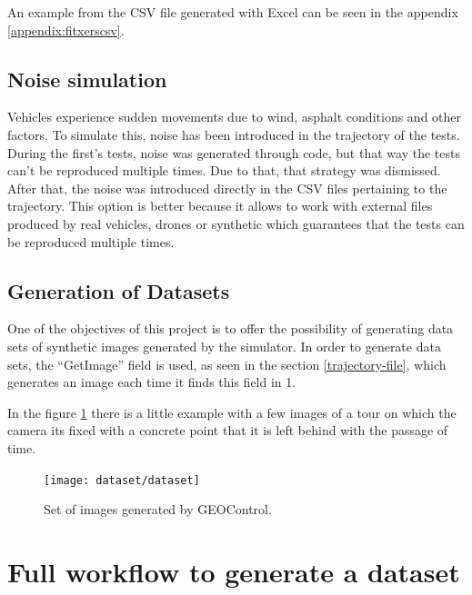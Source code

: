 \documentclass[10pt,a4paper,twocolumn,twoside]{article}
\begin{document}
An example from the CSV file generated with Excel can be seen in the appendix \ref{appendix:fitxerscsv}.

\subsection{Noise simulation}

Vehicles experience sudden movements due to wind, asphalt conditions and other factors. To simulate this, noise has been introduced in the trajectory of the tests. During the first’s tests, noise was generated through code, but that way the tests can't be reproduced multiple times. Due to that, that strategy was dismissed. After that, the noise was introduced directly in the CSV files pertaining to the trajectory. This option is better because it allows to work with external files produced by real vehicles, drones or synthetic which guarantees that the tests can be reproduced multiple times.

\subsection{Generation of Datasets}
One of the objectives of this project is to offer the possibility of generating data sets of synthetic images generated by the simulator. In order to generate data sets, the ``GetImage'' field is used, as seen in the section \ref{trajectory-file}, which generates an image each time it finds this field in 1.

In the figure \ref{fig-dataset} there is a little example with a few images of a tour on which the camera its fixed with a concrete point that it is left behind with the passage of time.

\begin{figure}[h]
\centering
  	\texttt{[image: dataset/dataset]}
	\caption{Set of images generated by GEOControl.}
	\label{fig-dataset}
\end{figure}

\section{Full workflow to generate a dataset}
\end{document}
